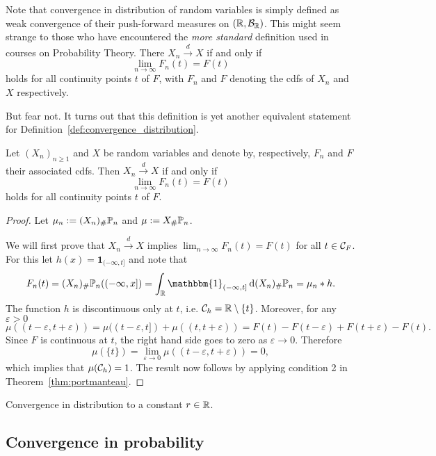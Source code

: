 Note that convergence in distribution of random variables is simply defined as weak convergence of their push-forward measures on $(\mathbb R, \mathcal B_{\mathbb R})$. This might seem strange to those who have encountered the \emph{more standard} definition used in courses on Probability Theory. There $X_n \stackrel{d}{\rightarrow} X$ if and only if
\[
	\lim_{n \to \infty} F_n(t) = F(t)
\]
holds for all continuity points $t$ of $F$, with $F_n$ and $F$ denoting the cdfs of $X_n$ and $X$ respectively.

But fear not. It turns out that this definition is yet another equivalent statement for Definition~\ref{def:convergence_distribution}. 


\begin{lemma}\label{lem:convergence_distribution_cdfs}
Let $(X_n)_{n \ge 1}$ and $X$ be random variables and denote by, respectively, $F_n$ and $F$ their associated cdfs. Then
$X_n \stackrel{d}{\rightarrow} X$ if and only if
\[
	\lim_{n \to \infty} F_n(t) = F(t)
\]
holds for all continuity points $t$ of $F$.
\end{lemma}

\begin{proof}
Let $\mu_n := (X_n)_\# \mathbb P_n$ and $\mu :=  X_\# \mathbb P_n$.

We will first prove that $X_n \stackrel{d}{\rightarrow} X$ implies $\lim_{n \to \infty} F_n(t) = F(t)$ for all $t \in \mathcal C_F$. For this let $h(x) = \mathbf{1}_{(-\infty,t]}$ and note that 
\[
	F_n(t) = (X_n)_\# \bbP_n ((-\infty,x]) = \int_\bbR \mathbbm{1}_{(-\infty,t]} \, \dd (X_n)_\# \bbP_n
	= \mu_n \ast h.
\]
The function $h$ is discontinuous only at $t$, i.e. $\mathcal C_h = \mathbb R \setminus \{t\}$. Moreover, for any $\varepsilon > 0$
\[
	\mu((t-\varepsilon, t+\varepsilon)) = \mu((t-\varepsilon,t]) + \mu((t,t+\varepsilon))
	= F(t) - F(t-\varepsilon) + F(t + \varepsilon) - F(t).
\]
Since $F$ is continuous at $t$, the right hand side goes to zero as $\varepsilon \to 0$. Therefore
\[
	\mu(\{t\}) = \lim_{\varepsilon \to 0} \mu((t-\varepsilon, t+\varepsilon)) = 0,
\]
which implies that $\mu(\mathcal C_h) = 1$. The result now follows by applying condition 2 in Theorem~\ref{thm:portmanteau}.
\end{proof}

Convergence in distribution to a constant $r \in \mathbb R$. 

\subsection{Convergence in probability}

